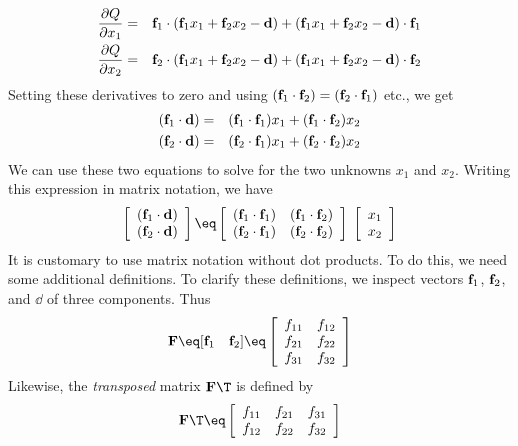 \begin{eqnarray} \label{eqn:Q1comp}
 {\partial Q \over \partial x_1} &= &
                    {\bf f}_1  \cdot ({\bf f}_1 x_1 + {\bf f}_2 x_2 -{\bf d} )  
                         +        ({\bf f}_1 x_1 + {\bf f}_2 x_2 -{\bf d} ) \cdot  {\bf f}_1
 \\
 {\partial Q \over \partial x_2} &= &
                            {\bf f}_2  \cdot ({\bf f}_1 x_1 + {\bf f}_2 x_2 -{\bf d} )  
                         +   ({\bf f}_1 x_1 + {\bf f}_2 x_2 -{\bf d} ) \cdot  {\bf f}_2
\end{eqnarray}
Setting these derivatives to zero and using
$({\bf f}_1 \cdot {\bf f}_2)=({\bf f}_2 \cdot {\bf f}_1)$ etc.,
we get
\begin{eqnarray}
({\bf f}_1 \cdot {\bf d} ) &= & ({\bf f}_1 \cdot {\bf f}_1) x_1 + ({\bf f}_1 \cdot {\bf f}_2)  x_2  \\
({\bf f}_2 \cdot {\bf d} ) &= & ({\bf f}_2 \cdot {\bf f}_1) x_1 + ({\bf f}_2 \cdot {\bf f}_2)  x_2
\end{eqnarray}
We can use these two equations to solve for
the two unknowns $x_1$ and $x_2$.
Writing this expression in matrix notation, we have
\begin{equation}
\left[ 
\begin{array}{c}
  (\ff_1 \cdot \dd ) \\ 
  (\ff_2 \cdot \dd ) \end{array} \right] 
\eq \left[ 
\begin{array}{ccc}
  (\ff_1 \cdot \ff_1) & (\ff_1 \cdot \ff_2)  \\
  (\ff_2 \cdot \ff_1) & (\ff_2 \cdot \ff_2)  \end{array} \right] 
\; \left[ 
\begin{array}{c}
  x_1 \\ 
  x_2 \end{array} \right]  \label{eqn:2by2}
\end{equation}
It is customary to use matrix notation without dot products.
To do this, we need some additional definitions.
To clarify these definitions,
we inspect vectors 
${\bf f}_1$, ${\bf f}_2$, and $\dd$ of three components.
Thus 
\begin{equation}
\bold F \eq [ \ff_1 \quad \ff_2 ] \eq 
\left[ 
\begin{array}{ccc}
  f_{11} & f_{12}  \\
  f_{21} & f_{22}  \\
  f_{31} & f_{32}  \end{array} \right] 
\end{equation}
Likewise, the {\it transposed} matrix $\bold F\T$ is defined by
\begin{equation}
\bold F\T \eq
\left[ 
\begin{array}{ccc}
  f_{11} & f_{21} & f_{31}  \\
  f_{12} & f_{22} & f_{32}  \end{array} \right] 
\end{equation}
